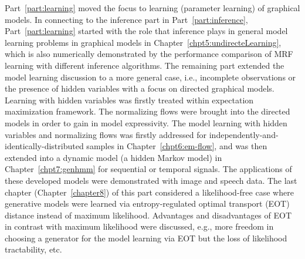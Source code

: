 Part~\ref{part:learning} moved the focus to learning (parameter learning) of graphical models. In connecting to the inference part in Part~\ref{part:inference}, Part~\ref{part:learning} started with the role that inference plays in general model learning problems in graphical models in Chapter~\ref{chpt5:undirecteLearning}, which is also numerically demonstrated by the performance comparison of MRF learning with different inference algorithms. The remaining part extended the model learning discussion to a more general case, i.e., incomplete observations or the presence of hidden variables with a focus on directed graphical models. Learning with hidden variables was firstly treated within expectation maximization framework. The normalizing flows were brought into the directed models in order to gain in model expressivity. The model learning with hidden variables and normalizing flows was firstly addressed for independently-and-identically-distributed samples in Chapter~\ref{chpt6:em-flow}, and was then extended into a dynamic model (a hidden Markov model) in Chapter~\ref{chpt7:genhmm} for sequential or temporal signals. The applications of these developed models were demonstrated with image and speech data. The last chapter (Chapter~\ref{chapter8}) of this part considered a likelihood-free case where generative models were learned via entropy-regulated optimal transport (EOT) distance instead of maximum likelihood. Advantages and disadvantages of EOT in contrast with maximum likelihood were discussed, e.g., more freedom in choosing a generator for the model learning via EOT but the loss of likelihood tractability, etc.


